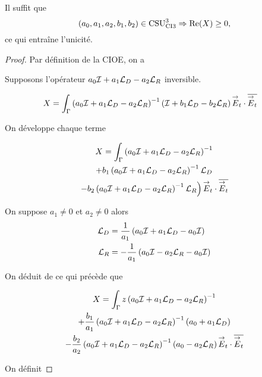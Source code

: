   
  \begin{prop}
    \label{prop:csu:ci3-3}
    Il suffit que
    \begin{equation*}
      (a_0,a_1,a_2,b_1,b_2) \in \CSU[3]{CI3} \Rightarrow \Re(X) \ge 0,
    \end{equation*}
    ce qui entraîne l'unicité.
  \end{prop}

  \begin{proof}
    Par définition de la CIOE, on a

    Supposons l'opérateur \(a_0\oI + a_1 \LD - a_2 \LR\) inversible.

    \begin{align*}
      X &= \int_\Gamma \left(a_0\oI + a_1 \LD - a_2 \LR \right)^{-1}\left( \oI + b_1 \LD - b_2 \LR \right) \vE_t\cdot \conj{\vE_t}
    \end{align*}

    On développe chaque terme

    \begin{multline*}
      X = \int_\Gamma \left(a_0\oI + a_1 \LD - a_2 \LR \right)^{-1}
      \\
      + b_1 \left(a_0\oI + a_1 \LD - a_2 \LR \right)^{-1}\LD
      \\
      \left.
      - b_2 \left(a_0\oI + a_1 \LD - a_2 \LR \right)^{-1}\LR \right) \vE_t\cdot \conj{\vE_t}
    \end{multline*}

    On suppose \(a_1\not=0\) et \(a_2\not=0\) alors
    \begin{align*}
      \LD & = \frac{1}{a_1}\left(a_0\oI + a_1 \LD - a_0\oI\right)
      \\
      \LR & = -\frac{1}{a_1}\left(a_0\oI - a_2 \LR - a_0\oI\right)
    \end{align*}


    On déduit de ce qui précède que

    \begin{multline*}
      X = \int_\Gamma z\left(a_0\oI + a_1 \LD - a_2 \LR \right)^{-1}
      \\
      + \frac{b_1}{a_1} \left(a_0\oI + a_1 \LD - a_2 \LR \right)^{-1}\left(a_0+a_1\LD\right)
      \\
      - \frac{b_2}{a_2} \left(a_0\oI + a_1 \LD - a_2 \LR \right)^{-1}\left(a_0-a_2\LR\right) \vE_t\cdot \conj{\vE_t}
    \end{multline*}

    On définit


\end{proof}
